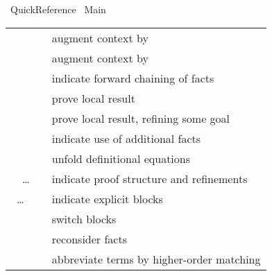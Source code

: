 %
\begin{isabellebody}%
\def\isabellecontext{Quick{\isacharunderscore}Reference}%
%
\isadelimtheory
\isanewline
\isanewline
%
\endisadelimtheory
%
\isatagtheory
{}\isamarkupfalse%
\ Quick{\isacharunderscore}Reference\isanewline
{}\ Main\isanewline
{}%
\endisatagtheory
{\isafoldtheory}%
%
\isadelimtheory
%
\endisadelimtheory
%
\isamarkuptrue%
%
\isamarkuptrue%
%
\isamarkuptrue%
%
\begin{isamarkuptext}%
\begin{tabular}{ll}
    \mbox{\isa{\isacommand{fix}}}~\isa{x} & augment context by \isa{{\isachardoublequote}{\isasymAnd}x{\isachardot}\ {\isasymbox}{\isachardoublequote}} \\
    \mbox{\isa{\isacommand{assume}}}~\isa{{\isachardoublequote}a{\isacharcolon}\ {\isasymphi}{\isachardoublequote}} & augment context by \isa{{\isachardoublequote}{\isasymphi}\ {\isasymLongrightarrow}\ {\isasymbox}{\isachardoublequote}} \\
    \mbox{\isa{\isacommand{then}}} & indicate forward chaining of facts \\
    \mbox{\isa{\isacommand{have}}}~\isa{{\isachardoublequote}a{\isacharcolon}\ {\isasymphi}{\isachardoublequote}} & prove local result \\
    \mbox{\isa{\isacommand{show}}}~\isa{{\isachardoublequote}a{\isacharcolon}\ {\isasymphi}{\isachardoublequote}} & prove local result, refining some goal \\
    \mbox{\isa{\isacommand{using}}}~\isa{a} & indicate use of additional facts \\
    \mbox{\isa{\isacommand{unfolding}}}~\isa{a} & unfold definitional equations \\
    \mbox{\isa{\isacommand{proof}}}~\isa{{\isachardoublequote}m\isactrlsub {\isadigit{1}}{\isachardoublequote}}~\dots~\mbox{\isa{\isacommand{qed}}}~\isa{{\isachardoublequote}m\isactrlsub {\isadigit{2}}{\isachardoublequote}} & indicate proof structure and refinements \\
    \mbox{\isa{\isacommand{{\isacharbraceleft}}}}~\dots~\mbox{\isa{\isacommand{{\isacharbraceright}}}} & indicate explicit blocks \\
    \mbox{\isa{\isacommand{next}}} & switch blocks \\
    \mbox{\isa{\isacommand{note}}}~\isa{{\isachardoublequote}a\ {\isacharequal}\ b{\isachardoublequote}} & reconsider facts \\
    \mbox{\isa{\isacommand{let}}}~\isa{{\isachardoublequote}p\ {\isacharequal}\ t{\isachardoublequote}} & abbreviate terms by higher-order matching \\
  \end{tabular}


\end{isamarkuptext}
\end{isabellebody}
